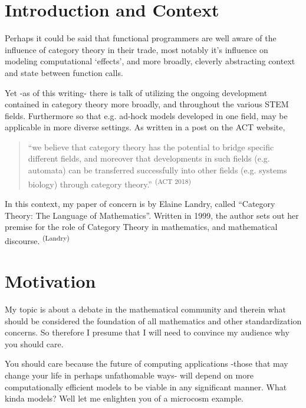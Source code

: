 \section*{Introduction and Context}

Perhaps it could be said that functional programmers are well aware of the influence of category theory in their trade, most notably it’s influence on modeling computational `effects', and more broadly, cleverly abstracting context and state between function calls. 

Yet -as of this writing- there is talk of utilizing the ongoing development contained in category theory more broadly, and throughout the various STEM fields. Furthermore so that e.g. ad-hock models developed in one field, may be applicable in more diverse settings. As written in a post on the ACT website,
\begin{quotation}
``we believe that category theory has the potential to bridge specific different fields, and moreover that developments in such fields (e.g. automata) can be transferred successfully into other fields (e.g. systems biology) through category theory.''
\textsuperscript{(ACT 2018)}
\end{quotation}

In this context, my paper of concern is by Elaine Landry, called ``Category Theory: The Language of Mathematics''. Written in 1999, the author sets out her premise for the role of Category Theory in mathematics, and mathematical discourse. \textsuperscript{(Landry)}

\section*{Motivation}

My topic is about a debate in the mathematical community and therein what should be considered the foundation of all mathematics and other standardization concerns. So therefore I presume that I will need to convince my audience why you should care.

You should care because the future of computing applications -those that may change your life in perhaps unfathomable ways- will depend on more computationally efficient models to be viable in any significant manner. What kinda models? Well let me enlighten you of a microcosm example.

